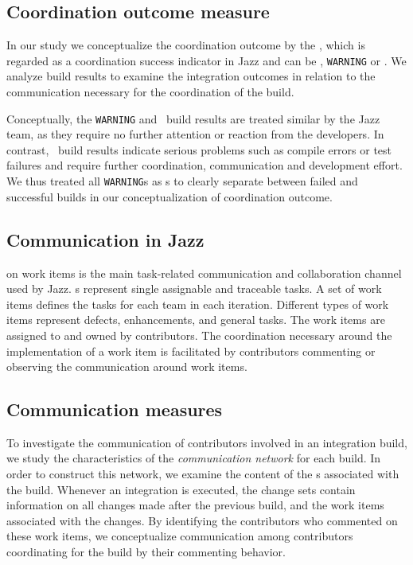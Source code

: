 \subsection{Coordination outcome measure}
In our study we conceptualize the coordination outcome by the ,
which is regarded as a coordination success indicator in Jazz and can be \error,
\texttt{WARNING} or \ok. We analyze build results to examine the integration
outcomes in relation to the communication necessary for the coordination of the
build.

Conceptually, the \texttt{WARNING} and \ok\ build results are treated similar by
the Jazz team, as they require no further attention or reaction from the
developers. In contrast, \error\ build results indicate serious problems such as
compile errors or test failures and require further coordination, communication
and development effort. We thus treated all \texttt{WARNING}s as \ok s to clearly
separate between failed and successful builds in our conceptualization of
coordination outcome.


\subsection{Communication in Jazz}

 on work items is the main task-related communication and
collaboration channel used by Jazz. s represent single assignable
and traceable tasks. A set of work items defines the tasks for each team in each
iteration. Different types of work items represent defects, enhancements, and
general tasks. The work items are assigned to and owned by contributors. The
coordination necessary around the implementation of a work item is facilitated by
contributors commenting or observing the communication around work items.

\subsection{Communication measures}
To investigate the communication of contributors involved in an integration
build, we study the characteristics of the \emph{communication network} for each
build. In order to construct this network, we examine the content of the
s associated with the build. Whenever an integration is executed,
the change sets contain information on all changes made after the previous build,
and the work items associated with the changes. By identifying the contributors
who commented on these work items, we conceptualize communication among
contributors coordinating for the build by their commenting behavior.


